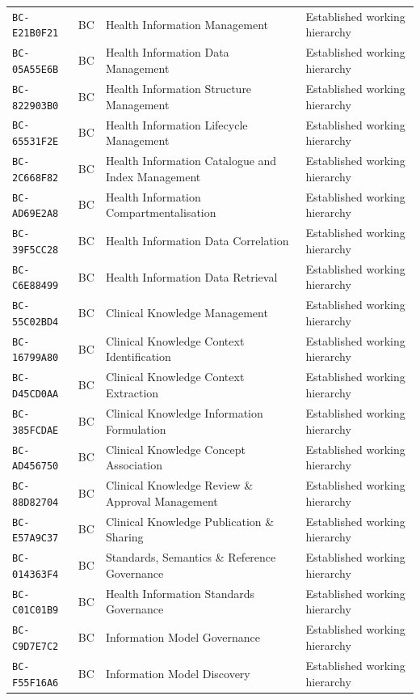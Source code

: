 \documentclass[11pt,a4paper,openany]{book}
\begin{document}
\begin{longtable}{@{}p{.19\linewidth}p{.12\linewidth}p{.39\linewidth}p{.24\linewidth}@{}}
\texttt{BC-E21B0F21} & BC & Health Information Management & Established working hierarchy \\
\texttt{BC-05A55E6B} & BC & Health Information Data Management & Established working hierarchy \\
\texttt{BC-822903B0} & BC & Health Information Structure Management & Established working hierarchy \\
\texttt{BC-65531F2E} & BC & Health Information Lifecycle Management & Established working hierarchy \\
\texttt{BC-2C668F82} & BC & Health Information Catalogue and Index Management & Established working hierarchy \\
\texttt{BC-AD69E2A8} & BC & Health Information Compartmentalisation & Established working hierarchy \\
\texttt{BC-39F5CC28} & BC & Health Information Data Correlation & Established working hierarchy \\
\texttt{BC-C6E88499} & BC & Health Information Data Retrieval & Established working hierarchy \\
\texttt{BC-55C02BD4} & BC & Clinical Knowledge Management & Established working hierarchy \\
\texttt{BC-16799A80} & BC & Clinical Knowledge Context Identification & Established working hierarchy \\
\texttt{BC-D45CD0AA} & BC & Clinical Knowledge Context Extraction & Established working hierarchy \\
\texttt{BC-385FCDAE} & BC & Clinical Knowledge Information Formulation & Established working hierarchy \\
\texttt{BC-AD456750} & BC & Clinical Knowledge Concept Association & Established working hierarchy \\
\texttt{BC-88D82704} & BC & Clinical Knowledge Review \& Approval Management & Established working hierarchy \\
\texttt{BC-E57A9C37} & BC & Clinical Knowledge Publication \& Sharing & Established working hierarchy \\
\texttt{BC-014363F4} & BC & Standards, Semantics \& Reference Governance & Established working hierarchy \\
\texttt{BC-C01C01B9} & BC & Health Information Standards Governance & Established working hierarchy \\
\texttt{BC-C9D7E7C2} & BC & Information Model Governance & Established working hierarchy \\
\texttt{BC-F55F16A6} & BC & Information  Model Discovery & Established working hierarchy \\

\end{longtable}
\end{document}
